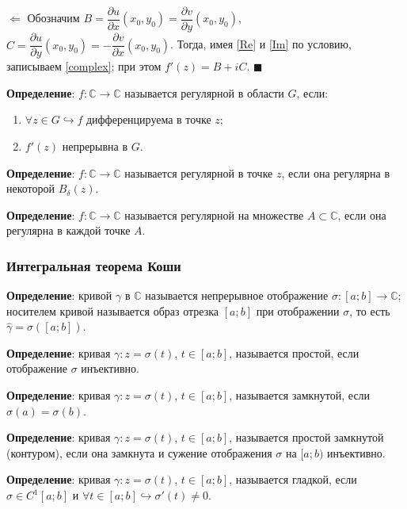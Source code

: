 \documentclass[12pt, a4paper, reqno]{article}
\begin{document}
    $\boxed{\Leftarrow}$ Обозначим $B = \dfrac{\partial u}{\partial x}(x_0, y_0) =
    \dfrac{\partial v}{\partial y}(x_0, y_0)$, $C = \dfrac{\partial u}{\partial y}(x_0, y_0) =
    -\dfrac{\partial v}{\partial x}(x_0, y_0)$. Тогда, имея \eqref{Re} и \eqref{Im} по условию,
    записываем \eqref{complex}; при этом $f'(z) = B + iC$. $\blacksquare$

    \textbf{Определение}: $f: \mathbb{C} \to \mathbb{C}$ называется регулярной в области $G$, если:
    \begin{enumerate}
        \item $\forall z \in G \hookrightarrow f$ дифференцируема в точке $z$;
        \item $f'(z)$ непрерывна в $G$.
    \end{enumerate}

    \textbf{Определение}: $f: \mathbb{C} \to \mathbb{C}$ называется регулярной в точке $z$, если
    она регулярна в некоторой $B_{\delta}(z)$.

    \textbf{Определение}: $f: \mathbb{C} \to \mathbb{C}$ называется регулярной на множестве
    $A \subset \mathbb{C}$, если она регулярна в каждой точке $A$.

    \subsubsection{Интегральная теорема Коши}

    \textbf{Определение}: кривой $\gamma$ в $\mathbb{C}$ называется непрерывное отображение
    $\sigma: [a; b] \to \mathbb{C}$; носителем кривой называется образ отрезка $[a; b]$ при
    отображении $\sigma$, то есть $\hat{\gamma} = \sigma([a; b])$.

    \textbf{Определение}: кривая $\gamma: z = \sigma(t)$, $t \in [a; b]$, называется простой, если
    отображение $\sigma$ инъективно.

    \textbf{Определение}: кривая $\gamma: z = \sigma(t)$, $t \in [a; b]$, называется замкнутой, если
    $\sigma(a) = \sigma(b)$.

    \textbf{Определение}: кривая $\gamma: z = \sigma(t)$, $t \in [a; b]$, называется простой замкнутой
    (\hypertarget{complex-circuit}{контуром}), если она замкнута и сужение отображения $\sigma$ на
    $[a; b)$ инъективно.

    \textbf{Определение}: кривая $\gamma: z = \sigma(t)$, $t \in [a; b]$, называется гладкой, если
    $\sigma \in C^1[a; b]$ и $\forall t \in [a; b] \hookrightarrow \sigma'(t) \neq 0$.
\end{document}
